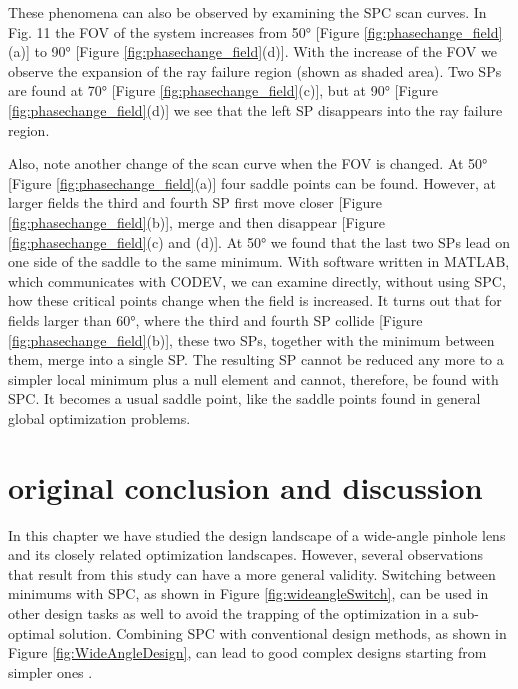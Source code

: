 These phenomena can also be observed by examining the SPC scan curves. In Fig. 11 the FOV of the system increases from 50° [Figure \ref{fig:phasechange_field}(a)] to 90° [Figure \ref{fig:phasechange_field}(d)]. With the increase of the FOV we observe the expansion of the ray failure region (shown as shaded area). Two SPs are found at 70° [Figure \ref{fig:phasechange_field}(c)], but at 90° [Figure \ref{fig:phasechange_field}(d)] we see that the left SP disappears into the ray failure region.

Also, note another change of the scan curve when the FOV is changed. At 50° [Figure \ref{fig:phasechange_field}(a)] four saddle points can be found. However, at larger fields the third and fourth SP first move closer [Figure \ref{fig:phasechange_field}(b)], merge and then disappear [Figure \ref{fig:phasechange_field}(c) and (d)]. At 50° we found that the last two SPs lead on one side of the saddle to the same minimum. With software written in MATLAB, which communicates with CODEV, we can examine directly, without using SPC, how these critical points change when the field is increased. It turns out that for fields larger than 60°, where the third and fourth SP collide [Figure \ref{fig:phasechange_field}(b)], these two SPs, together with the minimum between them, merge into a single SP. The resulting SP cannot be reduced any more to a simpler local minimum plus a null element and cannot, therefore, be found with SPC. It becomes a usual saddle point, like the saddle points found in general global optimization problems.


\section{original conclusion and discussion}
In this chapter we have studied the design landscape of a wide-angle pinhole lens and its closely related optimization landscapes. However, several observations that result from this study can have a more general validity. Switching between minimums with SPC, as shown in Figure \ref{fig:wideangleSwitch}, can be used in other design tasks as well to avoid the trapping of the optimization in a sub-optimal solution. Combining SPC with conventional design methods, as shown in Figure \ref{fig:WideAngleDesign}, can lead to good complex designs starting from simpler ones \cite{LivshitsSP2014}.

